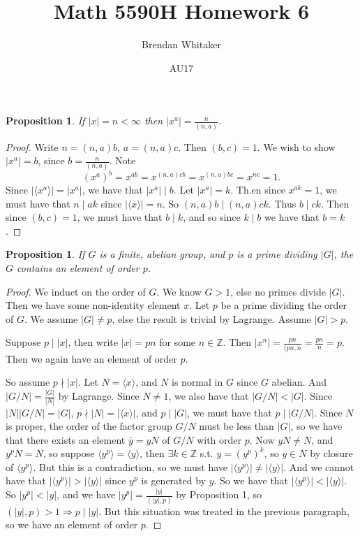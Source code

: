 \documentclass[10pt,oneside,reqno]{amsart}
\theoremstyle{plain}
\newtheorem{Prop}[Thm]{Proposition}
\theoremstyle{definition}
\begin{document}
\title{Math 5590H Homework 6}

\date{AU17}

\author[Brendan Whitaker]{Brendan Whitaker}

\maketitle


\begin{Prop}
If $|x| = n < \infty$ then $|x^a| = \frac{n}{(n,a)}$. 
\end{Prop}

\begin{proof}
Write $n = (n,a)b$, $a = (n,a)c$. Then $(b,c) = 1$. We wish to show $|x^a| = b$, since $b = \frac{n}{(n,a)}$. Note
\[(x^a)^b = x^{ab} = x^{(n,a)cb} = x^{(n,a)bc} = x^{nc} = 1. \]
Since $|\langle x^a \rangle| = |x^a|$, we have that $|x^a| \mid b$. Let $|x^a| = k$. Th.en since $x^{ak} = 1$, we must have that $n \mid ak$ since $|\langle x \rangle| = n$. So $(n,a)b \mid (n,a)ck$. Thus $b \mid ck$. Then since $(b,c) = 1$, we must have that $b \mid k$, and so since $k \mid b$ we have that $b = k$. 
\end{proof}
\begin{Prop}
If $G$ is a finite, abelian group, and $p$ is a prime dividing $|G|$, the $G$ contains an element of order $p$. 
\end{Prop}

\begin{proof}
We induct on the order of $G$. We know $G > 1$, else no primes divide $|G|$. Then we have some non-identity element $x$. Let $p$ be a prime dividing the order of $G$. We assume $|G| \neq p$, else the result is trivial by Lagrange. Assume $|G| > p$. 

Suppose $p \mid |x|$, then write $|x| = pn$ for some $n \in \mathbb{Z}$. Then $|x^n| = \frac{pn}{(pn,n} = \frac{pn}{n} = p$. Then we again have an element of order $p$. 

So assume $p \nmid |x|$. Let $N = \langle x \rangle $, and $N$ is normal in $G$ since $G$ abelian. And $|G/N| = \frac{|G|}{|N|}$ by Lagrange. Since $N \neq 1$, we also have that $|G/N| < |G|$. Since $|N||G/N| = |G|$, $p \nmid |N| = |\langle x\rangle |$, and $p \mid |G|$, we must have that $p \mid |G/N|$. Since $N$ is proper, the order of the factor group $G/N$ must be less than $|G|$, so we have that there exists an element $\bar{y} = yN$ of $G/N$ with order $p$. Now $yN \neq N$, and $y^pN = N$, so suppose $\langle y^p \rangle = \langle y \rangle$, then $\exists k \in \mathbb{Z}$ s.t. $y = (y^p)^k$, so $y \in N$ by closure of $\langle y^p \rangle$. But this is a contradiction, so we must have $|\langle y^p \rangle| \neq |\langle y \rangle|$.  And we cannot have that $|\langle y^p \rangle| > |\langle y \rangle|$ since $y^p$ is generated by $y$. So we have that $|\langle y^p \rangle| < |\langle y \rangle|$. So $|y^p| < |y|$, and we have $|y^p| = \frac{|y|}{(|y|,p)}$ by Proposition 1, so $(|y|,p) > 1 \Rightarrow p \mid |y|$. But this situation was treated in the previous paragraph, so we have an element of order $p$. 
\end{proof}
\end{document}
